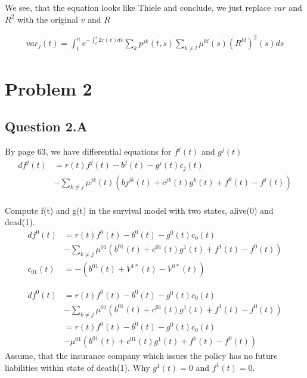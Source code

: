 \documentclass[12pt]{article}
\begin{document}
We see, that the equation looks like Thiele and conclude, we just replace $var$ and $R^2$ with the original $v$ and $R$ 

\begin{equation}
\begin{split}
var_j(t) = \int_t^n {e^{-\int_t^s{2r(v)dv}} \sum_k p^{jk}(t,s)\sum_{k\neq l} \mu^{kl}(s)(R^{kl})^2(s)ds}
\end{split}
\end{equation}

\section{Problem 2}

\subsection{Question 2.A}
By page 63, we have differential equations for $f^j(t)$ and $g^j(t)$
\begin{equation}
\begin{split}
df^j(t) & = r(t)f^j(t) - b^j(t) - g^j(t)c_j(t) 
\\ & - \sum_{k\neq j} \mu^{jk}(t) (bj^{jk}(t) + c^{jk}(t)g^k(t) + f^k(t) - f^j(t)) \\
\end{split}
\end{equation}

Compute f(t) and g(t) in the survival model with two states, alive(0) and dead(1).
\begin{equation}
\begin{split}
df^0(t) & = r(t)f^0(t) - b^0(t) - g^0(t)c_0(t) 
\\ & - \sum_{k\neq j} \mu^{01}(b^{01}(t) + c^{01}(t)g^1(t) + f^1(t) - f^0(t))
\\ c_{01}(t) & = -(b^{01}(t) + V^{1*}(t) - V^{0*}(t))
\end{split}
\end{equation}

\begin{equation}
\begin{split}
df^0(t) & = r(t)f^0(t) - b^0(t) - g^0(t)c_0(t) 
\\ & - \sum_{k\neq j} \mu^{01}(b^{01}(t) + c^{01}(t)g^1(t) + f^1(t) - f^0(t))
\\ & = r(t)f^0(t) - b^0(t) - g^0(t)c_0(t) 
\\ & - \mu^{01}(b^{01}(t) + c^{01}(t)g^1(t) + f^1(t) - f^0(t))
\end{split}
\end{equation}
Assume, that the insurance company which issues the policy has no future liabilities within state of death(1). Why $g^1(t) = 0$ and $f^1(t) = 0$. 
\end{document}
